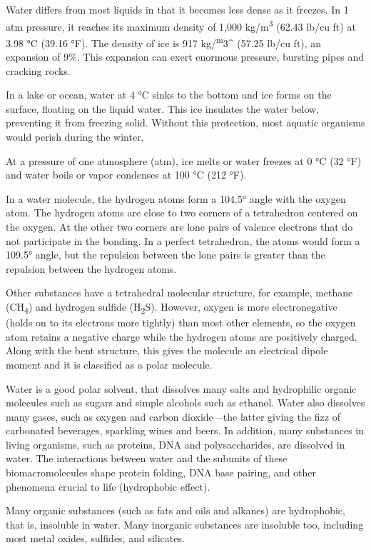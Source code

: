 Water differs from most liquids in that it becomes less dense as it freezes. In 1 atm pressure, it reaches its maximum density of 1,000 kg/m\textsuperscript{3} (62.43 lb/cu ft) at 3.98 °C (39.16 °F). The density of ice is 917 kg/\textsuperscript{m}3\^{} (57.25 lb/cu ft), an expansion of 9\%. This expansion can exert enormous pressure, bursting pipes and cracking rocks.

In a lake or ocean, water at 4 °C sinks to the bottom and ice forms on the surface, floating on the liquid water. This ice insulates the water below, preventing it from freezing solid. Without this protection, most aquatic organisms would perish during the winter.

At a pressure of one atmosphere (atm), ice melts or water freezes at 0 °C (32 °F) and water boils or vapor condenses at 100 °C (212 °F).

In a water molecule, the hydrogen atoms form a 104.5° angle with the oxygen atom. The hydrogen atoms are close to two corners of a tetrahedron centered on the oxygen. At the other two corners are lone pairs of valence electrons that do not participate in the bonding. In a perfect tetrahedron, the atoms would form a 109.5° angle, but the repulsion between the lone pairs is greater than the repulsion between the hydrogen atoms.

Other substances have a tetrahedral molecular structure, for example, methane (CH\textsubscript{4}) and hydrogen sulfide (H\textsubscript{2}S). However, oxygen is more electronegative (holds on to its electrons more tightly) than most other elements, so the oxygen atom retains a negative charge while the hydrogen atoms are positively charged. Along with the bent structure, this gives the molecule an electrical dipole moment and it is classified as a polar molecule.

Water is a good polar solvent, that dissolves many salts and hydrophilic organic molecules such as sugars and simple alcohols such as ethanol. Water also dissolves many gases, such as oxygen and carbon dioxide---the latter giving the fizz of carbonated beverages, sparkling wines and beers. In addition, many substances in living organisms, such as proteins, DNA and polysaccharides, are dissolved in water. The interactions between water and the subunits of these biomacromolecules shape protein folding, DNA base pairing, and other phenomena crucial to life (hydrophobic effect).

Many organic substances (such as fats and oils and alkanes) are hydrophobic, that is, insoluble in water. Many inorganic substances are insoluble too, including most metal oxides, sulfides, and silicates.

